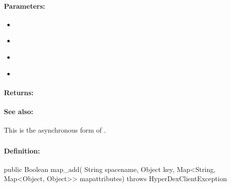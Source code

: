 \paragraph{Parameters:}
\begin{itemize}[noitemsep]
\item {}\\

\item {}\\

\item {}\\

\item {}\\

\end{itemize}

\paragraph{Returns:}


\paragraph{See also:}  This is the asynchronous form of .

\pagebreak
\subsubsection{}
\label{api:java:map_add}


\paragraph{Definition:}
\begin{javacode}
public Boolean map_add(
        String spacename,
        Object key,
        Map<String, Map<Object, Object>> mapattributes) throws HyperDexClientException
\end{javacode}

